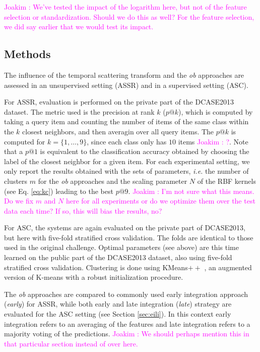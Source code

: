 \documentclass[journal]{IEEEtran}
\newcommand{\ja}[1]{\textcolor{magenta}{Joakim : #1}}
\begin{document}
\ja{We've tested the impact of the logarithm here, but not of the feature selection or standardization. Should we do this as well? For the feature selection, we did say earlier that we would test its impact.}

\subsection{Methods}

The influence of the temporal scattering transform and the \emph{ob} approaches are assessed in an unsupervised setting (ASSR) and in a supervised setting (ASC).

For ASSR, evaluation is performed on the private part of the DCASE2013 dataset. The metric used is the precision at rank $k$ ($p@k$), which is computed by taking a query item and counting the number of items of the same class within the $k$ closest neighbors, and then averagin over all query items. The $p@k$ is computed for $k=\{1,\ldots,9\}$, since each class only has $10$ items \ja{?}. Note that a $p@1$ is equivalent to the classification accuracy obtained by choosing the label of the closest neighbor for a given item. For each experimental setting, we only report the results obtained with the sets of parameters, \emph{i.e.} the number of clusters $m$ for the \emph{ob} approaches and the scaling parameter $N$ of the RBF kernels (see Eq. \ref{eq:kc}) leading to the best $p@9$. \ja{I'm not sure what this means. Do we fix $m$ and $N$ here for all experiments or do we optimize them over the test data each time? If so, this will bias the results, no?}
 
For ASC, the systems are again evaluated on the private part of DCASE2013, but here with five-fold stratified cross validation. The folds are identical to those used in the original challenge. Optimal parameters (see above) are this time learned on the public part of the DCASE2013 dataset, also using five-fold stratified cross validation. Clustering is done using KMeans$++$ \cite{arthur2007k}, an augmented version of K-means with a robust initialization procedure.

The \emph{ob} approaches are compared to commonly used early integration approach (\emph{early}) for ASSR, while both early and late integration (\emph{late}) strategy are evaluated for the ASC setting (see Section \ref{sec:eili}). In this context early integration refers to an averaging of the features and late integration refers to a majority voting of the predictions. \ja{We should perhaps mention this in that particular section instead of over here.}
\end{document}
